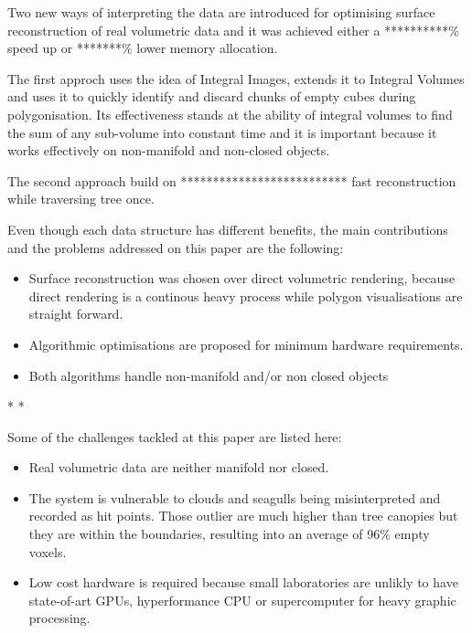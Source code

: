 \documentclass{subfiles}
\begin{document}


Two new ways of interpreting the data are introduced for optimising surface reconstruction of real volumetric data and it was achieved either a **********\% speed up or *******\% lower memory allocation. 

The first approch uses the idea of Integral Images, extends it to Integral Volumes and uses it to quickly identify and discard chunks of empty cubes during polygonisation. Its effectiveness stands at the ability of integral volumes to find the sum of any sub-volume into constant time and it is important because it works effectively on non-manifold and non-closed objects. 

The second approach build on **************************
fast reconstruction while traversing tree once. 

Even though each data structure has different benefits, the main contributions and the problems addressed on this paper are the following:
\begin{itemize}
	\item Surface reconstruction was chosen over direct volumetric rendering, because direct rendering is a continous heavy process while polygon visualisations are straight forward.  
	\item Algorithmic optimisations are proposed for minimum hardware requirements. 
	\item Both algorithms handle non-manifold and/or non closed objects
\end{itemize}


*%
*%

Some of the challenges tackled at this paper are listed here:
\begin{itemize}
	\item Real volumetric data are neither manifold nor closed. 
	\item The system is vulnerable to clouds and seagulls being misinterpreted and recorded as hit points. Those outlier are much higher than tree canopies but they are within the boundaries, resulting into an average of 96\% empty voxels.    
	\item Low cost hardware is required because small laboratories are unlikly to have state-of-art GPUs, hyperformance CPU or supercomputer for heavy graphic processing. 
\end{itemize}
\end{document}
